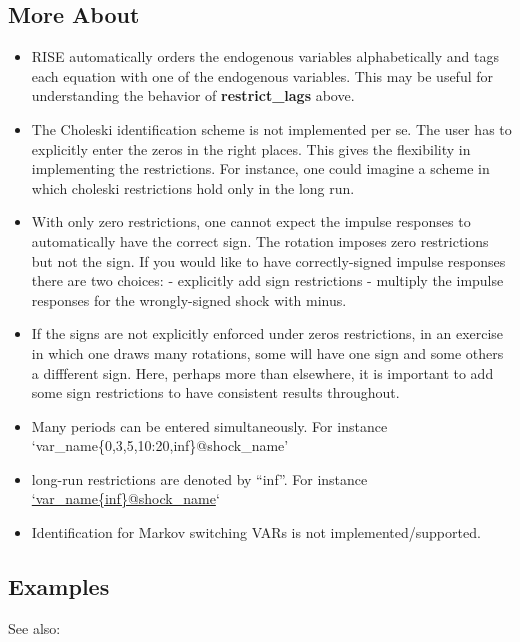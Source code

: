\documentclass[letterpaper,10pt,english]{sphinxmanual}
\begin{document}
\subsection{More About}
\label{classes/models/@rfvar/rfvar:id150}\begin{itemize}
\item {} 
RISE automatically orders the endogenous variables alphabetically and
tags each equation with one of the endogenous variables. This may be
useful for understanding the behavior of \textbf{restrict\_lags} above.

\item {} 
The Choleski identification scheme is not implemented per se. The user
has to explicitly enter the zeros in the right places. This gives the
flexibility in implementing the restrictions. For instance, one could
imagine a scheme in which choleski restrictions hold only in the long
run.

\item {} 
With only zero restrictions, one cannot expect the impulse responses to
automatically have the correct sign. The rotation imposes zero
restrictions but not the sign. If you would like to have
correctly-signed impulse responses there are two choices:
- explicitly add sign restrictions
- multiply the impulse responses for the wrongly-signed shock with
minus.

\item {} 
If the signs are not explicitly enforced under zeros restrictions,
in an exercise in which one draws many rotations, some will have
one sign and some others a diffferent sign. Here, perhaps more than
elsewhere, it is important to add some sign restrictions to have
consistent results throughout.

\item {} 
Many periods can be entered simultaneously. For instance
`var\_name\{0,3,5,10:20,inf\}@shock\_name'

\item {} 
long-run restrictions are denoted by ``inf''. For instance
\href{mailto:'var\_name\{inf\}@shock\_name}{`var\_name\{inf\}@shock\_name}`

\item {} 
Identification for Markov switching VARs is not implemented/supported.

\end{itemize}


\subsection{Examples}
\label{classes/models/@rfvar/rfvar:id151}
See also:
\end{document}
